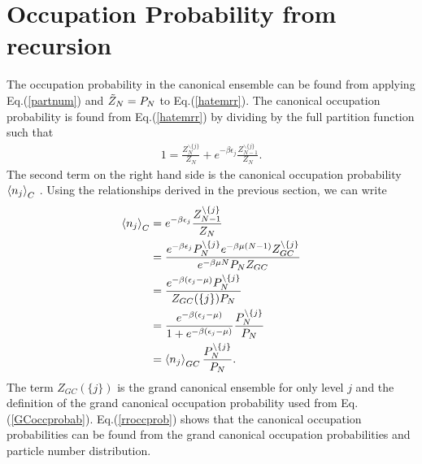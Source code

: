 \section{Occupation Probability from recursion}
The occupation probability in the canonical ensemble can be found from applying Eq.\@ (\ref{partnum}) and $\Tilde{Z}_N=P_N$ to Eq.\@ (\ref{hatemrr}). The canonical occupation probability is found from Eq.\@ (\ref{hatemrr}) by dividing by the full partition function such that 
\begin{align}
    1=\frac{Z_N^{\backslash\{j\}}}{Z_N}+e^{-\beta\epsilon_j}\frac{Z_{N-1}^{\backslash\{j\}}}{Z_N}.
\end{align}
The second term on the right hand side is the canonical occupation probability $\left<{n_j}\right>_C$ \cite{Hatem2020}. Using the relationships derived in the previous section, we can write
\begin{align}
    \left<{n_j}\right>_C&=e^{-\beta\epsilon_j}\frac{Z_{N-1}^{\backslash\{j\}}}{Z_N}\nonumber\\
    &=\frac{e^{-\beta\epsilon_j}P_N^{\backslash\{j\}}e^{-\beta\mu(N-1)}Z_{GC}^{\backslash\{j\}}}{e^{-\beta\mu N} P_N Z_{GC}}\nonumber\\
    &=\frac{e^{-\beta(\epsilon_j-\mu)} P_N^{\backslash\{j\}}}{Z_{GC}(\{j\}) P_N}\nonumber\\
    &=\frac{e^{-\beta(\epsilon_j-\mu)}}{1+e^{-\beta(\epsilon_j-\mu)}} \frac{P_N^{\backslash\{j\}}}{P_N}\nonumber\\
    &=\left<{n_j}\right>_{GC} \frac{P_N^{\backslash\{j\}}}{P_N}. \label{rroccprob}
\end{align}
The term $Z_{GC}(\{j\})$ is the grand canonical ensemble for only level $j$ and the definition of the grand canonical occupation probability used from Eq.\@ (\ref{GCoccprobab}). Eq.\@ (\ref{rroccprob}) shows that the canonical occupation probabilities can be found from the grand canonical occupation probabilities and particle number distribution. 


